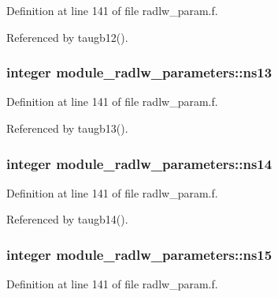 Definition at line 141 of file radlw\+\_\+param.\+f.



Referenced by taugb12().

\subsubsection[{\texorpdfstring{ns13}{ns13}}]{\setlength{\rightskip}{0pt plus 5cm}integer module\+\_\+radlw\+\_\+parameters\+::ns13}\hypertarget{group__module__radlw__main_ga239c74495526cdf72b28e1f5c1d0318e}{}\label{group__module__radlw__main_ga239c74495526cdf72b28e1f5c1d0318e}


Definition at line 141 of file radlw\+\_\+param.\+f.



Referenced by taugb13().

\subsubsection[{\texorpdfstring{ns14}{ns14}}]{\setlength{\rightskip}{0pt plus 5cm}integer module\+\_\+radlw\+\_\+parameters\+::ns14}\hypertarget{group__module__radlw__main_ga1d49c23da2ed69069a97f861a28a531e}{}\label{group__module__radlw__main_ga1d49c23da2ed69069a97f861a28a531e}


Definition at line 141 of file radlw\+\_\+param.\+f.



Referenced by taugb14().

\subsubsection[{\texorpdfstring{ns15}{ns15}}]{\setlength{\rightskip}{0pt plus 5cm}integer module\+\_\+radlw\+\_\+parameters\+::ns15}\hypertarget{group__module__radlw__main_ga9662e6bd344b1dbbfa7cc4429753bb10}{}\label{group__module__radlw__main_ga9662e6bd344b1dbbfa7cc4429753bb10}


Definition at line 141 of file radlw\+\_\+param.\+f.



